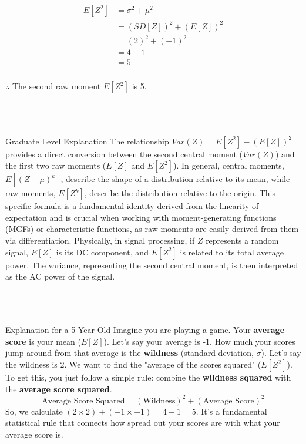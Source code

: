 \documentclass{article}
\begin{document}
\begin{align*}
E[Z^2] &= \sigma^2 + \mu^2 \\
&= (SD[Z])^2 + (E[Z])^2 \\
&= (2)^2 + (-1)^2 \\
&= 4 + 1 \\
&= 5
\end{align*}

\subsubsection*{\normalfont}{$\therefore$ The second raw moment $E[Z^2]$ is 5.}

\noindent\rule{\textwidth}{0.4pt}\\

\subsubsection*{\normalfont}{Graduate Level Explanation}
The relationship $Var(Z) = E[Z^2] - (E[Z])^2$ provides a direct conversion between the second central moment ($Var(Z)$) and the first two raw moments ($E[Z]$ and $E[Z^2]$). In general, central moments, $E[(Z-\mu)^k]$, describe the shape of a distribution relative to its mean, while raw moments, $E[Z^k]$, describe the distribution relative to the origin. This specific formula is a fundamental identity derived from the linearity of expectation and is crucial when working with moment-generating functions (MGFs) or characteristic functions, as raw moments are easily derived from them via differentiation. Physically, in signal processing, if $Z$ represents a random signal, $E[Z]$ is its DC component, and $E[Z^2]$ is related to its total average power. The variance, representing the second central moment, is then interpreted as the AC power of the signal.

\noindent\rule{\textwidth}{0.4pt}\\

\subsubsection*{\normalfont}{Explanation for a 5-Year-Old}
Imagine you are playing a game. Your \textbf{average score} is your mean ($E[Z]$). Let's say your average is -1. How much your scores jump around from that average is the \textbf{wildness} (standard deviation, $\sigma$). Let's say the wildness is 2. We want to find the "average of the scores squared" ($E[Z^2]$). To get this, you just follow a simple rule: combine the \textbf{wildness squared} with the \textbf{average score squared}.
$$ \text{Average Score Squared} = (\text{Wildness})^2 + (\text{Average Score})^2 $$
So, we calculate $(2 \times 2) + (-1 \times -1) = 4 + 1 = 5$. It's a fundamental statistical rule that connects how spread out your scores are with what your average score is.
\end{document}
